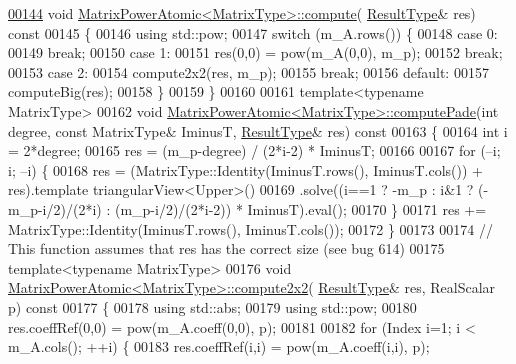 \begin{DoxyCode}
\hyperlink{class_eigen_1_1_matrix_power_atomic_ac3cdfb54a5b60079d068784534cbc174}{00144} \textcolor{keywordtype}{void} \hyperlink{class_eigen_1_1_matrix_power_atomic_ac3cdfb54a5b60079d068784534cbc174}{MatrixPowerAtomic<MatrixType>::compute}(
      \hyperlink{group___core___module_class_eigen_1_1_block}{ResultType}& res)\textcolor{keyword}{ const}
00145 \textcolor{keyword}{}\{
00146   \textcolor{keyword}{using} std::pow;
00147   \textcolor{keywordflow}{switch} (m\_A.rows()) \{
00148     \textcolor{keywordflow}{case} 0:
00149       \textcolor{keywordflow}{break};
00150     \textcolor{keywordflow}{case} 1:
00151       res(0,0) = pow(m\_A(0,0), m\_p);
00152       \textcolor{keywordflow}{break};
00153     \textcolor{keywordflow}{case} 2:
00154       compute2x2(res, m\_p);
00155       \textcolor{keywordflow}{break};
00156     \textcolor{keywordflow}{default}:
00157       computeBig(res);
00158   \}
00159 \}
00160 
00161 \textcolor{keyword}{template}<\textcolor{keyword}{typename} MatrixType>
00162 \textcolor{keywordtype}{void} \hyperlink{class_eigen_1_1_matrix_power_atomic}{MatrixPowerAtomic<MatrixType>::computePade}(\textcolor{keywordtype}{int} degree, \textcolor{keyword}{const}
       MatrixType& IminusT, \hyperlink{group___core___module_class_eigen_1_1_block}{ResultType}& res)\textcolor{keyword}{ const}
00163 \textcolor{keyword}{}\{
00164   \textcolor{keywordtype}{int} i = 2*degree;
00165   res = (m\_p-degree) / (2*i-2) * IminusT;
00166 
00167   \textcolor{keywordflow}{for} (--i; i; --i) \{
00168     res = (MatrixType::Identity(IminusT.rows(), IminusT.cols()) + res).template triangularView<Upper>()
00169     .solve((i==1 ? -m\_p : i&1 ? (-m\_p-i/2)/(2*i) : (m\_p-i/2)/(2*i-2)) * IminusT).eval();
00170   \}
00171   res += MatrixType::Identity(IminusT.rows(), IminusT.cols());
00172 \}
00173 
00174 \textcolor{comment}{// This function assumes that res has the correct size (see bug 614)}
00175 \textcolor{keyword}{template}<\textcolor{keyword}{typename} MatrixType>
00176 \textcolor{keywordtype}{void} \hyperlink{class_eigen_1_1_matrix_power_atomic}{MatrixPowerAtomic<MatrixType>::compute2x2}(
      \hyperlink{group___core___module_class_eigen_1_1_block}{ResultType}& res, RealScalar p)\textcolor{keyword}{ const}
00177 \textcolor{keyword}{}\{
00178   \textcolor{keyword}{using} std::abs;
00179   \textcolor{keyword}{using} std::pow;
00180   res.coeffRef(0,0) = pow(m\_A.coeff(0,0), p);
00181 
00182   \textcolor{keywordflow}{for} (Index i=1; i < m\_A.cols(); ++i) \{
00183     res.coeffRef(i,i) = pow(m\_A.coeff(i,i), p);

\end{DoxyCode}
